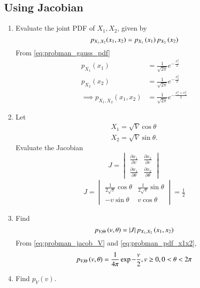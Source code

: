 \subsection{Using Jacobian}
%
\begin{enumerate}[label=\thesubsection.\arabic*.,ref=\thesubsection.\theenumi]

\item
Evaluate the joint PDF of $X_1,X_2$,  given by
%
\begin{equation}
p_{X_1,X_2}(x_1,x_2) = p_{X_1}\left(x_1\right)p_{X_2}\left(x_2\right)
\end{equation}
%
\solution From \eqref{eq:probman_gauss_pdf}
\begin{align}
p_{X_1}(x_1)&=\frac {1}{\sqrt {2\pi }}e^{-\frac {x_1^2}{2}}
\\
p_{X_2}(x_2)&=\frac {1}{\sqrt {2\pi }}e^{-\frac {x_2^2}{2}}
\\
\implies p_{X_1,X_2}(x_1,x_2) &= \frac {1}{\sqrt {2\pi }}e^{-\frac {x_1^2+x_2^2}{2}}
\label{eq:probman_pdf_x1x2}
\end{align}
 
%
\item
Let 
\begin{align}
 X_1 = \sqrt{V}\cos \theta
\\
 X_2 = \sqrt{V} \sin \theta.
\end{align}
Evaluate the Jacobian 
%
\begin{equation}
J =
\begin{vmatrix}
\frac{\partial x_1}{\partial v} & \frac{\partial x_2}{\partial v} \\
\frac{\partial x_1}{\partial \theta} & \frac{\partial x_2}{\partial \theta} 
\end{vmatrix}
\end{equation}
%
\solution
\begin{align}
J=\begin{vmatrix}
     \frac{1}{2\sqrt{v}}\cos\theta & \frac{1}{2\sqrt{v}}\sin\theta\\
       -v\sin\theta & v\cos\theta
\end{vmatrix}=\frac{1}{2}
\label{eq:probman_jacob_V}
\end{align}
\item
Find
%
\begin{equation}
p_{V,\Theta}\left(v,\theta\right) = \left\vert J\right\vert p_{X_1,X_2}\left(x_1,x_2\right)
\end{equation}
%
\solution From \eqref{eq:probman_jacob_V} and \eqref{eq:probman_pdf_x1x2},
\begin{align}
p_{V,\Theta}\left(v,\theta\right)=\frac{1}{4\pi}\exp{-\frac{v}{2}}, v \ge 0, 0 < \theta < 2\pi
\end{align}
%
\item
Find $p_{V}(v)$.  


\end{enumerate}
